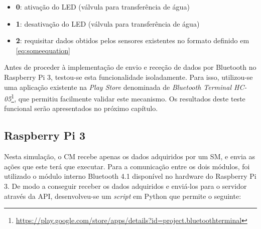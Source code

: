 \begin{itemize}
	\item \textbf{0}: ativação do \ac{LED} (válvula para transferência de água)
	\item \textbf{1}: desativação do \ac{LED} (válvula para transferência de água)
	\item \textbf{2}: requisitar dados obtidos pelos sensores existentes no formato definido em \ref{eq:someequation}
\end{itemize}

Antes de proceder à implementação de envio e receção de dados por Bluetooth no Raspberry Pi 3, testou-se esta funcionalidade isoladamente. Para isso, utilizou-se uma aplicação existente na \textit{Play Store} denominada  de \textit{Bluetooth Terminal HC-05}\footnote{\url{https://play.google.com/store/apps/details?id=project.bluetoothterminal}}, que permitiu facilmente validar este mecanismo. Os resultados deste teste funcional serão apresentados no próximo capítulo. 



\subsection{Raspberry Pi 3}

Nesta simulação, o \acl{CM} recebe apenas os dados adquiridos por um \acl{SM}, e envia as ações que este terá que executar.  Para a comunicação entre os dois módulos, foi utilizado o módulo interno Bluetooth 4.1 disponível no hardware do Raspberry Pi 3. De modo a conseguir receber os dados adquiridos e enviá-los para o servidor através da \ac{API}, desenvolveu-se um \textit{script} em Python que permite o seguinte: 


